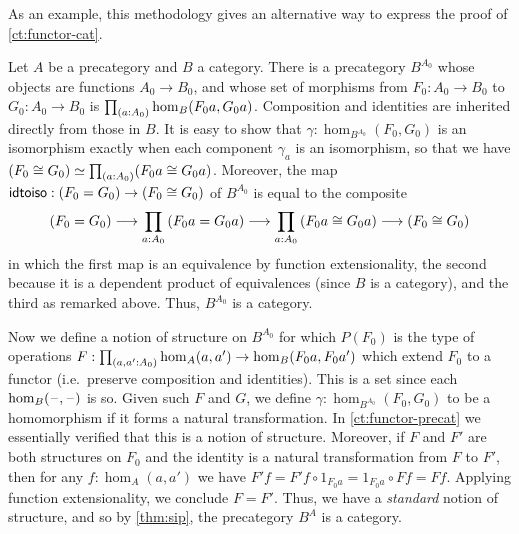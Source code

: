 As an example, this methodology gives an alternative way to express the proof of \cref{ct:functor-cat}.

\begin{eg}\label{ct:sip-functor-cat}
  Let $A$ be a precategory and $B$ a category.
  There is a precategory $B^{A_0}$ whose objects are functions $A_0 \to B_0$, and whose set of morphisms from $F_0:A_0 \to B_0$ to $G_0:A_0 \to B_0$ is $\prd{a:A_0} \hom_B(F_0 a, G_0 a)$.
  Composition and identities are inherited directly from those in $B$.
  It is easy to show that $\gamma:\hom_{B^{A_0}}(F_0, G_0)$ is an isomorphism exactly when each component $\gamma_a$ is an isomorphism, so that we have $\eqv{(F_0 \cong G_0)}{\prd{a:A_0} (F_0 a \cong G_0 a)}$.
  Moreover, the map $\mathsf{idtoiso} : (F_0 = G_0) \to (F_0 \cong G_0)$ of $B^{A_0}$ is equal to the composite
  \[ (F_0 = G_0) \longrightarrow \prd{a:A_0} (F_0 a  = G_0 a) \longrightarrow \prd{a:A_0} (F_0 a \cong G_0 a) \longrightarrow (F_0 \cong G_0) \]
  in which the first map is an equivalence by function extensionality, the second because it is a dependent product of equivalences (since $B$ is a category), and the third as remarked above.
  Thus, $B^{A_0}$ is a category.

  Now we define a notion of structure on $B^{A_0}$ for which $P(F_0)$ is the type of operations $F:\prd{a,a':A_0} \hom_A(a,a') \to \hom_B(F_0 a,F_0 a')$ which extend $F_0$ to a functor (i.e.\ preserve composition and identities).
  This is a set since each $\hom_B(\mathord{\hspace{1pt}\text{--}\hspace{1pt}},\mathord{\hspace{1pt}\text{--}\hspace{1pt}})$ is so.
  Given such $F$ and $G$, we define $\gamma:\hom_{B^{A_0}}(F_0, G_0)$ to be a homomorphism if it forms a natural transformation.
  In \cref{ct:functor-precat} we essentially verified that this is a notion of structure.
  Moreover, if $F$ and $F'$ are both structures on $F_0$ and the identity is a natural transformation from $F$ to $F'$, then for any $f:\hom_A(a,a')$ we have $F'f = F'f \circ 1_{F_0 a} = 1_{F_0 a}\circ F f = F f$.
  Applying function extensionality, we conclude $F = F'$.
  Thus, we have a \emph{standard} notion of structure, and so by \cref{thm:sip}, the precategory $B^A$ is a category.
\end{eg}

